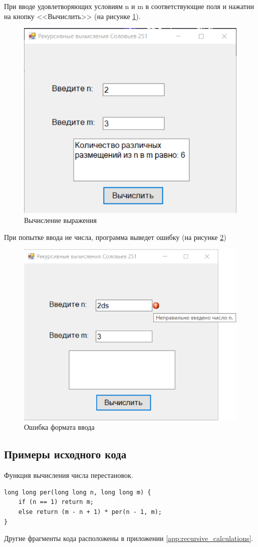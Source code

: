 При вводе удовлетворяющих условиям n и m в соответствующие поля и нажатии на кнопку <<Вычислить>> (на рисунке \ref{task3_launch2}).
\begin{figure}[H]
    \centering
    \includegraphics[width=0.6\linewidth]{lections/img/task3_launch2.png}
    \caption{Вычисление выражения}
    \label{task3_launch2}
\end{figure}

При попытке ввода не числа, программа выведет ошибку (на рисунке \ref{task3_launch3})
\begin{figure}[H]
    \centering
    \includegraphics[width=0.7\linewidth]{lections/img/task3_launch3.png}
    \caption{Ошибка формата ввода}
    \label{task3_launch3}
\end{figure}

\subsection{Примеры исходного кода}

Функция вычисления числа перестановок.
\begin{verbatim}
long long per(long long n, long long m) {
	if (n == 1) return m;
	else return (m - n + 1) * per(n - 1, m);
}
\end{verbatim}
Другие фрагменты кода расположены в приложении \ref{app:recursive_calculations}.
\sectionbreak